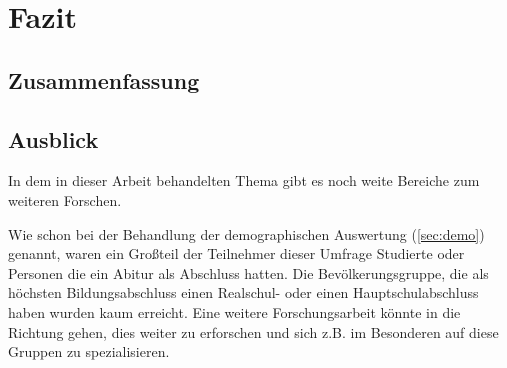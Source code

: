%
% 

\chapter{Fazit}


\section{Zusammenfassung}

\section{Ausblick}
In dem in dieser Arbeit behandelten Thema gibt es noch weite Bereiche zum weiteren Forschen.

Wie schon bei der Behandlung der demographischen Auswertung (\ref{sec:demo}) genannt, waren ein Großteil der Teilnehmer dieser Umfrage Studierte oder Personen die ein Abitur als Abschluss hatten. Die Bevölkerungsgruppe, die als höchsten Bildungsabschluss einen Realschul- oder einen Hauptschulabschluss haben wurden kaum erreicht. Eine weitere Forschungsarbeit könnte in die Richtung gehen, dies weiter zu erforschen und sich z.B. im Besonderen auf diese Gruppen zu spezialisieren.

